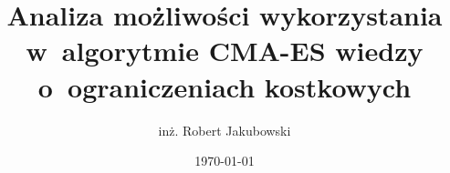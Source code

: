 \documentclass{mini}
\title{Analiza możliwości wykorzystania w~algorytmie CMA-ES wiedzy o~ograniczeniach kostkowych}
\author{inż. Robert Jakubowski}
\date{\today}
\begin{document}
\maketitle

\pagebreak
\end{document}
